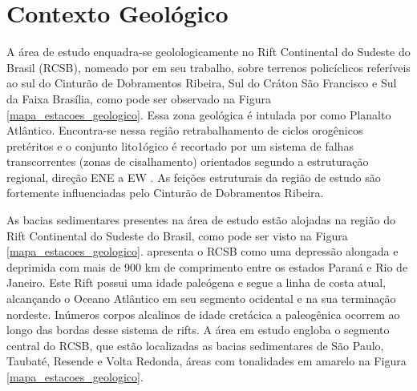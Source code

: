 \chapter{Contexto Geológico}

A área de estudo enquadra-se geolologicamente no Rift Continental do Sudeste do Brasil (RCSB), nomeado por \cite{Riccomini_1989} em seu trabalho, sobre terrenos policíclicos referíveis ao sul do Cinturão de Dobramentos Ribeira, Sul do Cráton São Francisco e Sul da Faixa Brasília, como pode ser observado na Figura \ref{mapa_estacoes_geologico}. Essa zona geológica é intulada por \cite{Almeida_Carneiro_1998} como Planalto Atlântico. Encontra-se nessa região retrabalhamento de ciclos orogênicos pretéritos e o conjunto lito1ógico é recortado por um sistema de falhas transcorrentes (zonas de cisalhamento) orientados segundo a estruturação regional, direção ENE a EW \citep{Hasui_Sadowski_1976}. As feições estruturais da região de estudo são fortemente influenciadas pelo Cinturão de Dobramentos Ribeira.

As bacias sedimentares presentes na área de estudo estão alojadas na região do Rift Continental do Sudeste do Brasil, como pode ser visto na Figura \ref{mapa_estacoes_geologico}. \cite{Riccomini_1989} apresenta o RCSB como uma depressão alongada e deprimida com mais de 900 km de comprimento entre os estados Paraná e Rio de Janeiro. Este Rift possui uma idade paleógena e segue a linha de costa atual, alcançando o Oceano Atlântico em seu segmento ocidental e na sua terminação nordeste. Inúmeros corpos alcalinos de idade cretácica a paleogênica ocorrem ao longo das bordas desse sistema de rifts. A área em estudo engloba o segmento central do RCSB, que estão localizadas as bacias sedimentares de São Paulo, Taubaté, Resende e Volta Redonda, áreas com tonalidades em amarelo na Figura \ref{mapa_estacoes_geologico}. 

